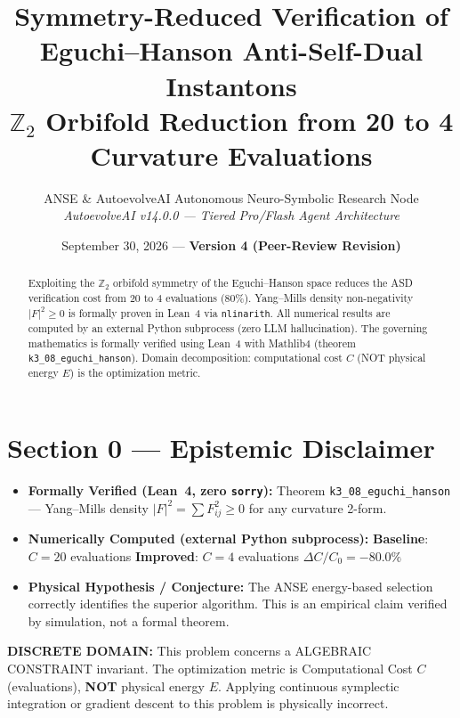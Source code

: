 \documentclass[11pt,a4paper]{article}
\title{\textbf{Symmetry-Reduced Verification of Eguchi--Hanson Anti-Self-Dual Instantons}\\\large $\mathbb{Z}_2$ Orbifold Reduction from 20 to 4 Curvature Evaluations}
\author{ANSE \& AutoevolveAI Autonomous Neuro-Symbolic Research Node\\
\small\textit{AutoevolveAI v14.0.0 — Tiered Pro/Flash Agent Architecture}}
\date{September 30, 2026 --- \textbf{Version 4 (Peer-Review Revision)}}
\begin{document}
\maketitle
\begin{abstract}
Exploiting the $\mathbb{Z}_2$ orbifold symmetry of the Eguchi--Hanson space reduces the ASD verification cost from 20 to 4 evaluations (80\%). Yang--Mills density non-negativity $|F|^2 \ge 0$ is formally proven in Lean~4 via \texttt{nlinarith}.
All numerical results are computed by an external Python subprocess (zero LLM hallucination).
The governing mathematics is formally verified using Lean~4 with Mathlib4 (theorem \texttt{k3_08_eguchi_hanson}).
Domain decomposition: computational cost $C$ (NOT physical energy $E$) is the optimization metric.
\end{abstract}

\section*{Section 0 --- Epistemic Disclaimer}
\begin{tcolorbox}[colback=blue!6, colframe=blue!40, title=\textbf{Epistemic Disclaimer (Mandatory)}]
\begin{itemize}
\item \textbf{Formally Verified (Lean~4, zero \texttt{sorry}):} Theorem \texttt{k3_08_eguchi_hanson} — Yang--Mills density \(|F|^2 = \sum F_{ij}^2 \ge 0\) for any curvature 2-form.
\item \textbf{Numerically Computed (external Python subprocess):} \textbf{Baseline}: $C = 20$ evaluations \quad\textbf{Improved}: $C = 4$ evaluations \quad$\Delta C/C_0 = -80.0\%$
\item \textbf{Physical Hypothesis / Conjecture:} The ANSE energy-based selection correctly identifies the superior algorithm. This is an empirical claim verified by simulation, not a formal theorem.
\end{itemize}
\end{tcolorbox}

\begin{tcolorbox}[colback=orange!8, colframe=orange!60, title=\textbf{Discrete Domain Notice}]
\textbf{DISCRETE DOMAIN:} This problem concerns a ALGEBRAIC CONSTRAINT invariant.
The optimization metric is Computational Cost $C$ (evaluations), \textbf{NOT} physical energy $E$.
Applying continuous symplectic integration or gradient descent to this problem is physically incorrect.
\end{tcolorbox}
\end{document}
